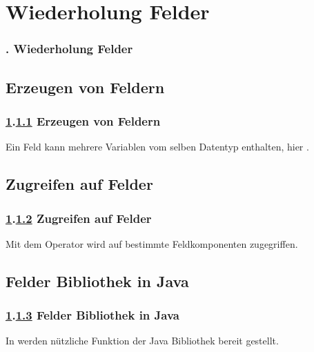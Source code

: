\def\stitle{Wiederholung Felder}
\section{\stitle}\label{K:wdh}
\begin{frame}
  \frametitle{\kap. \stitle}%
\tableofcontents[current]
\end{frame}

\def\stitle{Erzeugen von Feldern}
\subsection{\stitle}\label{S:Erzeugen}
\begin{frame}[t]%
  \frametitle{\ref{K:wdh}.\ref{S:Erzeugen} \stitle}
\medskip

Ein Feld kann mehrere Variablen vom selben Datentyp enthalten, hier .


\end{frame}


\def\stitle{Zugreifen auf Felder}
\subsection{\stitle}\label{S:Zugreifen}
\begin{frame}[t]%
  \frametitle{\ref{K:wdh}.\ref{S:Zugreifen} \stitle}
\medskip

Mit dem Operator \code{[]} wird auf bestimmte Feldkomponenten zugegriffen.


\end{frame}

\def\stitle{Felder Bibliothek in Java}
\subsection{\stitle}\label{S:bequem}
\begin{frame}[t]%
  \frametitle{\ref{K:wdh}.\ref{S:bequem} \stitle}
\medskip

In  werden n\"utzliche Funktion der Java Bibliothek bereit gestellt.


\end{frame}


